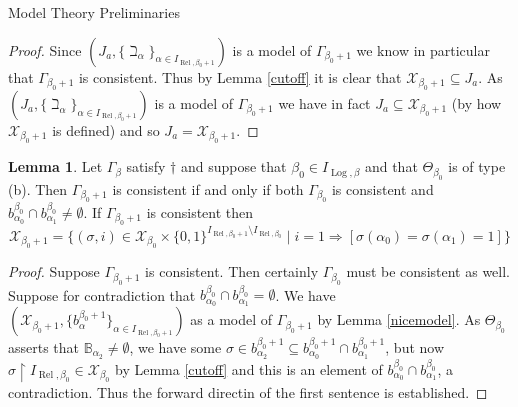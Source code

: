 \documentclass{amsart}
\theoremstyle{definition}\newtheorem{theorem}{Theorem}
\theoremstyle{definition}\newtheorem{bigtheorem}{Theorem}
\numberwithin{theorem}{section}
\theoremstyle{definition}\newtheorem{corollary}[theorem]{Corollary}
\theoremstyle{definition}\newtheorem{proposition}[theorem]{Proposition}
\theoremstyle{definition}\newtheorem{definition}[theorem]{Definition}
\theoremstyle{definition}\newtheorem{question}[theorem]{Question}
\theoremstyle{definition}\newtheorem{example}[theorem]{Example}
\theoremstyle{definition}\newtheorem{remark}[theorem]{Remark}
\theoremstyle{definition}\newtheorem{note}[theorem]{Note}
\theoremstyle{definition}\newtheorem{lemma}[theorem]{Lemma}
\theoremstyle{definition}\newtheorem{fact}[theorem]{Fact}
\theoremstyle{definition}\newtheorem{define}[theorem]{Definition}
\theoremstyle{definition}\newtheorem{definitions}[theorem]{Definitions}
\theoremstyle{definition}\newtheorem{claim}[theorem]{Claim}
\theoremstyle{definition}\newtheorem{obs}[theorem]{Observation}
\theoremstyle{definition}\newtheorem{construction}[theorem]{Construction}
\newcommand{\B}{\mathbb{B}}
\newcommand{\Rel}{\operatorname{Rel}}
\newcommand{\Log}{\operatorname{Log}}
\newcommand{\X}{\mathcal{X}}
\begin{document}
\begin{section}{Model Theory Preliminaries}
\begin{proof}
Since $(J_a, \{\beth_{\alpha}\}_{\alpha \in I_{\Rel, \beta_0 + 1}})$ is a model of $\Gamma_{\beta_0 + 1}$ we know in particular that $\Gamma_{\beta_0 + 1}$ is consistent.  Thus by Lemma \ref{cutoff} it is clear that $\X_{\beta_0 + 1} \subseteq J_a$.  As $(J_a, \{\beth_{\alpha}\}_{\alpha \in I_{\Rel, \beta_0 + 1}})$ is a model of $\Gamma_{\beta_0 + 1}$ we have in fact $J_a \subseteq \X_{\beta_0 + 1}$ (by how $\X_{\beta_0 + 1}$ is defined) and so $J_a = \X_{\beta_0 + 1}$.
\end{proof}

\begin{lemma}\label{nextstageb}  Let $\Gamma_{\beta}$ satisfy $\dagger$ and suppose that $\beta_0 \in I_{\Log, \beta}$ and that $\Theta_{\beta_0}$ is of type (b).  Then $\Gamma_{\beta_0 + 1}$ is consistent if and only if both $\Gamma_{\beta_0}$ is consistent and $b_{\alpha_0}^{\beta_0} \cap b_{\alpha_1}^{\beta_0} \neq \emptyset$.  If $\Gamma_{\beta_0 + 1}$ is consistent then $$\X_{\beta_0 + 1} = \{(\sigma, i)\in \X_{\beta_0} \times \{0, 1\}^{I_{\Rel, \beta_0 + 1} \setminus I_{\Rel, \beta_0}}\mid i = 1 \Rightarrow [\sigma(\alpha_0) = \sigma(\alpha_1) = 1]\}$$
\end{lemma}

\begin{proof}  Suppose $\Gamma_{\beta_0 + 1}$ is consistent.  Then certainly $\Gamma_{\beta_0}$ must be consistent as well.  Suppose for contradiction that $b_{\alpha_0}^{\beta_0} \cap b_{\alpha_1}^{\beta_0} = \emptyset$.  We have $(\X_{\beta_0 + 1}, \{b_{\alpha}^{\beta_0 + 1}\}_{\alpha \in I_{\Rel, \beta_0 + 1}})$ as a model of $\Gamma_{\beta_0 + 1}$ by Lemma \ref{nicemodel}.   As $\Theta_{\beta_0}$ asserts that $\B_{\alpha_2} \neq \emptyset$, we have some $\sigma \in b_{\alpha_2}^{\beta_0 + 1} \subseteq b_{\alpha_0}^{\beta_0 + 1} \cap b_{\alpha_1}^{\beta_0 + 1}$, but now $\sigma \upharpoonright I_{\Rel, \beta_0} \in \X_{\beta_0}$ by Lemma \ref{cutoff} and this is an element of $b_{\alpha_0}^{\beta_0} \cap b_{\alpha_1}^{\beta_0}$, a contradiction.  Thus the forward directin of the first sentence is established.


\end{proof}
\end{section}
\end{document}
